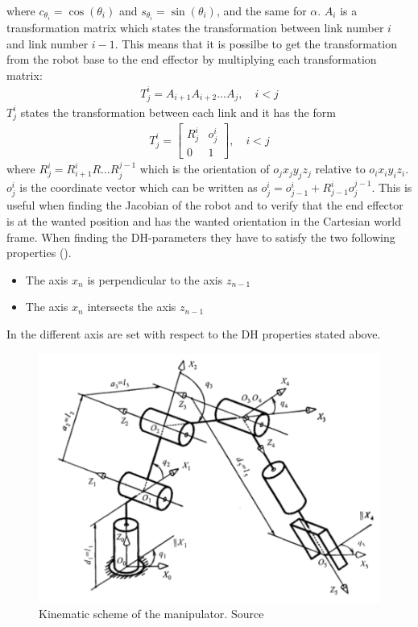 where $c_{\theta_i} = \cos{(\theta_i)}$ and $s_{\theta_i} = \sin{(\theta_i)}$, and the same for $\alpha$. $A_i$ is a transformation matrix which states the transformation between link number $i$ and link number $i-1$. This means that it is possilbe to get the transformation from the robot base to the end effector by multiplying each transformation matrix:
\begin{align*}
    T^i_j = A_{i+1}A_{i+2}...A_j, \quad i<j
\end{align*}
 $T^i_j$ states the transformation between each link and it has the form
 \begin{align*}
      T^i_j = 
      \begin{bmatrix}
          R^i_j & o^i_j\\
          0&1
      \end{bmatrix}, \quad i<j
 \end{align*}
 where $R^i_j = R^i_{i+1}R...R^{j-1}_j$ which is the orientation of $o_jx_jy_jz_j$ relative to $o_ix_iy_iz_i$. $o^i_j$ is the coordinate vector which can be written as $o^i_j = o^i_{j-1}+R^{i}_{j-1}o^{j-1}_j$. This is useful when finding the Jacobian of the robot and to verify that the end effector is at the wanted position and has the wanted orientation in the Cartesian world frame. When finding the DH-parameters they have to satisfy the two following properties (\cite{spong}).
 \begin{itemize}
     \item The axis $x_n$ is perpendicular to the axis $z_{n-1}$
     \item The axis $x_n$ intersects the axis $z_{n-1}$
 \end{itemize}

In  the different axis are set with respect to the DH properties stated above. 

\begin{figure}[htbp]
  \centering
  \includegraphics[width=.9\textwidth]{img/DHconv.png}
  \caption{Kinematic scheme of the manipulator. Source \cite{Kinematics}}
  \label{fig:dhf}
\end{figure}

